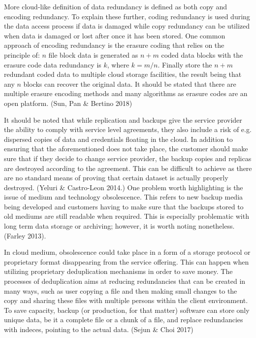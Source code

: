 \documentclass{article}
\begin{document}
\par
More cloud-like definition of data redundancy is defined as both copy and encoding redundancy. To explain these further, coding redundancy is used during the data access process if data is damaged while copy redundancy can be utilized when data is damaged or lost after once it has been stored. One common approach of encoding redundancy is the erasure coding that relies on the principle of: $n$ file block data is generated as $n + m$ coded data blocks with the erasure code data redundancy is $k$, where $k = m/n$. Finally store the $n + m$ redundant coded data to multiple cloud storage facilities, the result being that any $n$ blocks can recover the original data. It should be stated that there are multiple erasure encoding methods and many algorithms as erasure codes are an open platform. (Sun, Pan \& Bertino 2018)
\par
It should be noted that while replication and backups give the service provider the ability to comply with service level agreements, they also include a risk of e.g. dispersed copies of data and credentials floating in the cloud. In addition to ensuring that the aforementioned does not take place, the customer should make sure that if they decide to change service provider, the backup copies and replicas are destroyed according to the agreement. This can be difficult to achieve as there are no standard means of proving that certain dataset is actually properly destroyed. (Yeluri \& Castro-Leon 2014.)
One problem worth highlighting is the issue of medium and technology obsolescence. This refers to new backup media being developed and customers having to make sure that the backups stored to old mediums are still readable when required. This is especially problematic with long term data storage or archiving; however, it is worth noting nonetheless. (Farley 2013).
\par
In cloud medium, obsolescence could take place in a form of a storage protocol or proprietary format disappearing from the service offering. This can happen when utilizing proprietary deduplication mechanisms in order to save money. The processes of deduplication aims at reducing redundancies that can be created in many ways, such as user copying a file and then making small changes to the copy and sharing these files with multiple persons within the client environment. To save capacity, backup (or production, for that matter) software can store only unique data, be it a complete file or a chunk of a file, and replace redundancies with indeces, pointing to the actual data. (Sejun \& Choi 2017)
\end{document}
